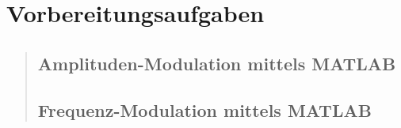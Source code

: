 \section{Vorbereitungsaufgaben}
    \begin{quote}
    
	    \subsection{Amplituden-Modulation mittels MATLAB}
		\begin{quote}
		
		\end{quote}
		
		\subsection{Frequenz-Modulation mittels MATLAB}
		\begin{quote}
		
		\end{quote}
		
	\end{quote}
         	


